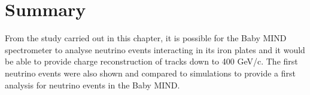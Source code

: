 

\section{Summary}
From the study carried out in this chapter, it is possible for the Baby MIND spectrometer to analyse neutrino events interacting in its iron plates and it would be able to provide charge reconstruction of tracks down to 400 GeV/c. The first neutrino events were also shown and compared to simulations to provide a first analysis for neutrino events in the Baby MIND.